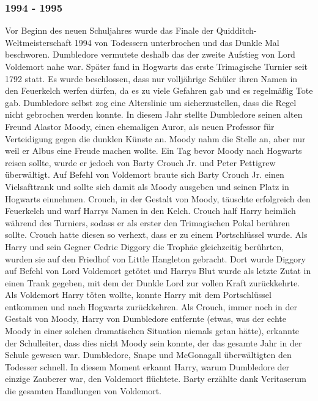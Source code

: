 \documentclass[a4paper, 10pt]{article}
\begin{document}
\subsubsection*{1994 - 1995}
Vor Beginn des neuen Schuljahres wurde das Finale der Quidditch-Weltmeisterschaft 1994 von Todessern unterbrochen und das Dunkle Mal beschworen. Dumbledore vermutete deshalb das der zweite Aufstieg von Lord Voldemort nahe war. Später fand in Hogwarts das erste Trimagische Turnier seit 1792 statt. Es wurde beschlossen, dass nur volljährige Schüler ihren Namen in den Feuerkelch werfen dürfen, da es zu viele Gefahren gab und es regelmäßig Tote gab. Dumbledore selbst zog eine Alterslinie um sicherzustellen, dass die Regel nicht gebrochen werden konnte. In diesem Jahr stellte Dumbledore seinen alten Freund Alastor Moody, einen ehemaligen Auror, als neuen Professor für Verteidigung gegen die dunklen Künste an. Moody nahm die Stelle an, aber nur weil er Albus eine Freude machen wollte.
\vspace{10pt}
\newline
{}  
Ein Tag bevor Moody nach Hogwarts reisen sollte, wurde er jedoch von Barty Crouch Jr. und Peter Pettigrew überwältigt. Auf Befehl von Voldemort braute sich Barty Crouch Jr. einen Vielsafttrank und sollte sich damit als Moody ausgeben und seinen Platz in Hogwarts einnehmen. Crouch, in der Gestalt von Moody, täuschte erfolgreich den Feuerkelch und warf Harrys Namen in den
Kelch. Crouch half Harry heimlich während des Turniers, sodass er als erster den Trimagischen Pokal berühren sollte. Crouch hatte diesen so verhext, dass er zu einem Portschlüssel wurde.
\vspace{10pt}
\newline
{}  
Als Harry und sein Gegner Cedric Diggory die Trophäe gleichzeitig berührten, wurden sie auf den Friedhof von Little Hangleton gebracht. Dort wurde Diggory auf Befehl von Lord Voldemort getötet und Harrys Blut wurde als letzte Zutat in einen Trank gegeben, mit dem der Dunkle Lord zur vollen Kraft zurückkehrte. Als Voldemort Harry töten wollte, konnte Harry mit dem Portschlüssel entkommen und nach Hogwarts zurückkehren.
\vspace{10pt}
\newline
{}  
Als Crouch, immer noch in der Gestalt von Moody, Harry von Dumbledore entfernte (etwas, was der echte Moody in einer solchen dramatischen Situation niemals getan hätte), erkannte der Schulleiter, dass dies nicht Moody sein konnte, der das gesamte Jahr in der Schule gewesen war. Dumbledore, Snape und McGonagall überwältigten den Todesser schnell. In diesem Moment erkannt Harry, warum Dumbledore der einzige Zauberer war, den Voldemort flüchtete. Barty erzählte dank Veritaserum die gesamten Handlungen von Voldemort.
\end{document}
